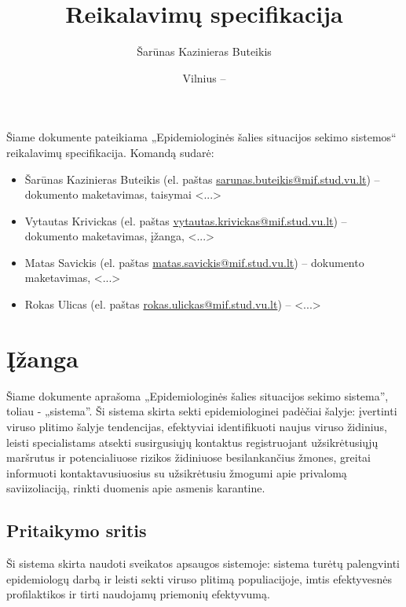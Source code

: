 \documentclass{VUMIFPSkursinis}
\title{Reikalavimų specifikacija}
\author{Šarūnas Kazinieras Buteikis}
\date{Vilnius – \the\year}
\begin{document}
\maketitle


Šiame dokumente pateikiama „Epidemiologinės šalies situacijos sekimo sistemos“
reikalavimų specifikacija. Komandą sudarė:
\begin{itemize}
	\item Šarūnas Kazinieras Buteikis (el. paštas \href{mailto:sarunas.buteikis@mif.stud.vu.lt}{sarunas.buteikis@mif.stud.vu.lt}) -- dokumento maketavimas, taisymai  {\color{red}<...>}
	\item Vytautas Krivickas (el. paštas \href{mailto:vytautas.krivickas@mif.stud.vu.lt}{vytautas.krivickas@mif.stud.vu.lt}) -- dokumento maketavimas, įžanga, {\color{red}<...>}
	\item Matas Savickis (el. paštas \href{mailto:matas.savickis@mif.stud.vu.lt}{matas.savickis@mif.stud.vu.lt}) -- dokumento maketavimas, {\color{red}<...>}
	\item Rokas Ulicas (el. paštas \href{mailto:rokas.ulickas@mif.stud.vu.lt}{rokas.ulickas@mif.stud.vu.lt}) -- {\color{red}<...>}
\end{itemize}

\newpage

\tableofcontents

\section{Įžanga}
Šiame dokumente aprašoma „Epidemiologinės šalies situacijos sekimo sistema”, toliau - „sistema”.
Ši sistema skirta sekti epidemiologinei padėčiai šalyje: įvertinti viruso plitimo šalyje tendencijas,
efektyviai identifikuoti naujus viruso židinius, leisti specialistams atsekti susirgusiųjų
kontaktus registruojant užsikrėtusiųjų maršrutus ir potencialiuose rizikos židiniuose
besilankančius žmones, greitai informuoti kontaktavusiuosius su užsikrėtusiu žmogumi
apie privalomą saviizoliaciją, rinkti duomenis apie asmenis karantine.

\subsection{Pritaikymo sritis}
Ši sistema skirta naudoti sveikatos apsaugos sistemoje: sistema turėtų palengvinti
epidemiologų darbą ir leisti sekti viruso plitimą populiacijoje, imtis efektyvesnės
profilaktikos ir tirti naudojamų priemonių efektyvumą.
\end{document}
